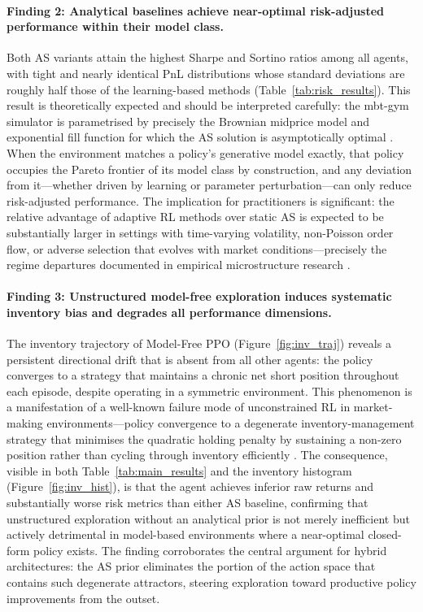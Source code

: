 \documentclass[11pt]{article}
\begin{document}
\paragraph{Finding 2: Analytical baselines achieve near-optimal
  risk-adjusted performance within their model class.}
Both AS variants attain the highest Sharpe and Sortino ratios among all
agents, with tight and nearly identical PnL distributions whose standard
deviations are roughly half those of the learning-based methods
(Table~\ref{tab:risk_results}).
This result is theoretically expected and should be interpreted carefully:
the mbt-gym simulator is parametrised by precisely the Brownian midprice
model and exponential fill function for which the AS solution is
asymptotically optimal \parencite{avellaneda2008hftlob}.
When the environment matches a policy's generative model exactly, that
policy occupies the Pareto frontier of its model class by construction,
and any deviation from it---whether driven by learning or parameter
perturbation---can only reduce risk-adjusted performance.
The implication for practitioners is significant: the relative advantage
of adaptive RL methods over static AS is expected to be substantially
larger in settings with time-varying volatility, non-Poisson order flow,
or adverse selection that evolves with market conditions---precisely the
regime departures documented in empirical microstructure research
\parencite{cont2013markovlob,guilbaud2013optimal,lehalle2019incorporating}.

\paragraph{Finding 3: Unstructured model-free exploration induces
  systematic inventory bias and degrades all performance dimensions.}
The inventory trajectory of Model-Free PPO (Figure~\ref{fig:inv_traj})
reveals a persistent directional drift that is absent from all other
agents: the policy converges to a strategy that maintains a chronic net
short position throughout each episode, despite operating in a
symmetric environment.
This phenomenon is a manifestation of a well-known failure mode of
unconstrained RL in market-making environments---policy convergence to
a degenerate inventory-management strategy that minimises the quadratic
holding penalty by sustaining a non-zero position rather than cycling
through inventory efficiently \parencite{gasperov2021rlmm,spooner2018mmrl}.
The consequence, visible in both Table~\ref{tab:main_results} and the
inventory histogram (Figure~\ref{fig:inv_hist}), is that the agent
achieves inferior raw returns and substantially worse risk metrics than
either AS baseline, confirming that unstructured exploration without an
analytical prior is not merely inefficient but actively detrimental in
model-based environments where a near-optimal closed-form policy exists.
The finding corroborates the central argument for hybrid architectures:
the AS prior eliminates the portion of the action space that contains
such degenerate attractors, steering exploration toward productive
policy improvements from the outset.
\end{document}
